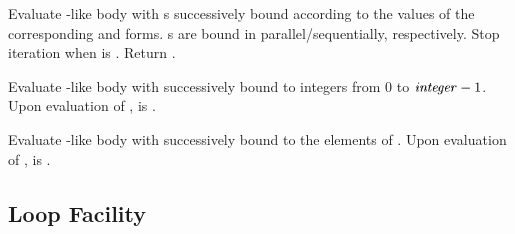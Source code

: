 \begin{LIST}{1cm}
  
  {
  Evaluate -like body with s successively bound according
  to the values of the corresponding  and 
  forms. s are bound in parallel/sequentially, respectively.
  Stop iteration when  is \T. Return .
  }

  {
  Evaluate -like body with  successively bound
  to integers from 0 to $\mbox{\VAR{integer}} - 1$. Upon evaluation of
  ,  is \NIL.
  }

  {
  Evaluate -like body with  successively bound
  to the elements of . Upon evaluation of
  ,  is \NIL.
  }


\end{LIST}

\subsection{Loop Facility}

